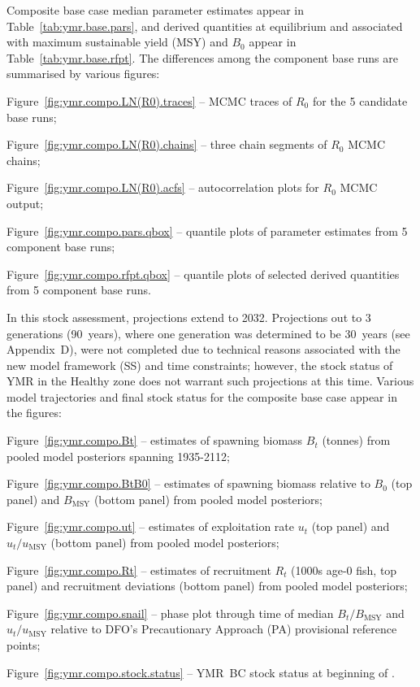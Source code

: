 \documentclass[11pt]{book}
\newcommand{\Bmsy}{B_\text{MSY}}
\newcommand{\umsy}{u_\text{MSY}}
\begin{document}
Composite base case median parameter estimates appear in Table~\ref{tab:ymr.base.pars}, and derived quantities at equilibrium and associated with maximum sustainable yield (MSY) and $B_0$ appear in Table~\ref{tab:ymr.base.rfpt}.
The differences among the component base runs are summarised by various figures:
\begin{itemize_csas}{}{}
  \item Figure~\ref{fig:ymr.compo.LN(R0).traces} -- MCMC traces of $R_0$ for the 5 candidate base runs;
  \item Figure~\ref{fig:ymr.compo.LN(R0).chains} -- three chain segments of $R_0$ MCMC chains;
  \item Figure~\ref{fig:ymr.compo.LN(R0).acfs}   -- autocorrelation plots for $R_0$ MCMC output;
  \item Figure~\ref{fig:ymr.compo.pars.qbox} -- quantile plots of parameter estimates from 5 component base runs;
  \item Figure~\ref{fig:ymr.compo.rfpt.qbox} -- quantile plots of selected derived quantities from 5 component base runs.
\end{itemize_csas}

In this stock assessment, projections extend to 2032. 
Projections out to 3 generations (90~years), where one generation was determined to be 30~years (see Appendix~D), were not completed due to technical reasons associated with the new model framework (SS) and time constraints; however, the stock status of YMR in the Healthy zone does not warrant such projections at this time.
Various model trajectories and final stock status for the composite base case appear in the figures:
\begin{itemize_csas}{}{}
  \item Figure~\ref{fig:ymr.compo.Bt}     -- estimates of spawning biomass $B_t$ (tonnes) from pooled model posteriors spanning 1935-2112;
  \item Figure~\ref{fig:ymr.compo.BtB0}   -- estimates of spawning biomass relative to $B_0$ (top panel) and $\Bmsy$ (bottom panel) from pooled model posteriors;
  \item Figure~\ref{fig:ymr.compo.ut}     -- estimates of exploitation rate $u_t$ (top panel) and $u_t/\umsy$ (bottom panel) from pooled model posteriors;
  \item Figure~\ref{fig:ymr.compo.Rt}     -- estimates of recruitment $R_t$ (1000s age-0 fish, top panel) and recruitment deviations (bottom panel) from pooled model posteriors;
  \item Figure~\ref{fig:ymr.compo.snail}  -- phase plot through time of median $B_t/\Bmsy$ and $u_t/\umsy$ relative to DFO's Precautionary Approach (PA) provisional reference points;
  \item Figure~\ref{fig:ymr.compo.stock.status} -- YMR~BC stock status at beginning of \currYear{}.
\end{itemize_csas}
\end{document}
